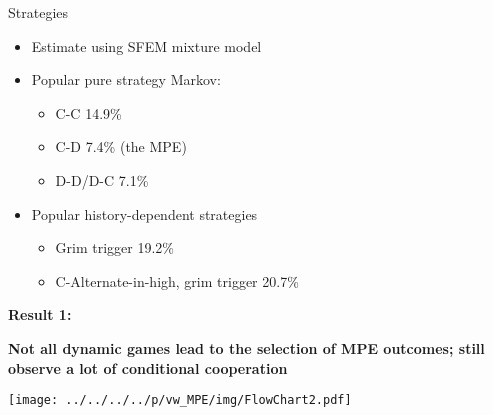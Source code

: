 \documentclass{beamer}
\begin{document}
\begin{frame}{Strategies}

\begin{itemize}
\item Estimate using SFEM mixture model
\item Popular pure strategy Markov:

\begin{itemize}
\item C-C 14.9\%
\item C-D 7.4\% (the MPE)
\item D-D/D-C 7.1\%
\end{itemize}
\item Popular history-dependent strategies

\begin{itemize}
\item Grim trigger 19.2\%
\item C-Alternate-in-high, grim trigger 20.7\%
\end{itemize}
\end{itemize}
\end{frame}

\begin{frame}


\textbf{Result 1: }



\textbf{Not all dynamic games lead to the selection of MPE outcomes;
still observe a lot of conditional cooperation}
\end{frame}

\begin{frame}


\begin{center}\texttt{[image: ../../../../p/vw\_MPE/img/FlowChart2.pdf]}
\end{center}
\end{frame}
\end{document}
